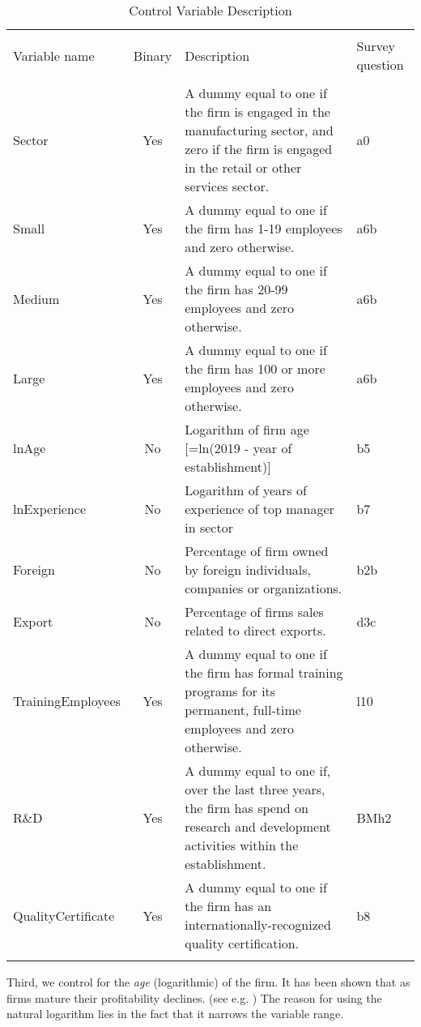 \begin{table}[!hb] 
  \centering 
  \caption{Control Variable Description} 
  \label{} 
  \begin{adjustbox}{width=\columnwidth,center}
\begin{tabular}{@{\extracolsep{5pt}}lcp{10cm}p{2cm}} 
\\[-1.8ex]\hline 
\hline \\[-1.8ex] 
Variable name & \multicolumn{1}{c}{Binary} & Description & Survey question \\ 
\hline \\[-1.8ex]
Sector & Yes & A dummy equal to one if the firm is engaged in the manufacturing sector, and zero if the firm is engaged in the retail or other services sector. & a0 \\ 
Small & Yes & A dummy equal to one if the firm has 1-19 employees and zero otherwise. & a6b  \\ 
Medium & Yes & A dummy equal to one if the firm has 20-99 employees and zero otherwise. & a6b \\ 
Large & Yes & A dummy equal to one if the firm has 100 or more employees and zero otherwise. & a6b  \\ 
lnAge & No & Logarithm of firm age [=ln(2019 - year of establishment)] & b5  \\ 
lnExperience & No & Logarithm of years of experience of top manager in sector & b7   \\ 
Foreign & No & Percentage of firm owned by foreign individuals, companies or organizations. & b2b \\ 
Export & No & Percentage of firms sales related to direct exports. & d3c \\ 
TrainingEmployees & Yes & A dummy equal to one if the firm has formal training programs for its permanent, full-time employees and zero otherwise. & l10 \\ 
R\&D & Yes & A dummy equal to one if, over the last three years, the firm has spend on research and development activities within the establishment. & BMh2  \\ 
QualityCertificate & Yes & A dummy equal to one if the firm has an internationally-recognized quality certification. & b8 \\ 
\hline \\[-1.8ex] 
\end{tabular}
\end{adjustbox}
\end{table} 
Third, we control for the \textit{age} (logarithmic) of the firm. It has been shown that as firms mature their profitability declines. (see e.g. \citet{loderer2010firm}) The reason for using the natural logarithm lies in the fact that it narrows the variable range. \citep[p. 221]{wooldridge}


